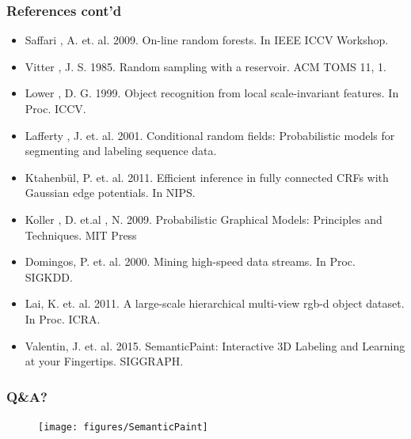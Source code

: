 \documentclass[mathserif, 10pt]{beamer}
\begin{document}
\begin{frame}
\frametitle{References cont'd}
\fontsize{6pt}{7.2}\selectfont
\begin{itemize}
  \item Saffari , A. et. al. 2009. On-line random forests. In IEEE ICCV Workshop.
  
  \item Vitter , J. S. 1985. Random sampling with a reservoir. ACM TOMS 11, 1. 
  
  \item Lower , D. G. 1999. Object recognition from local scale-invariant features. In Proc. ICCV.
  
  \item Lafferty , J. et. al. 2001. Conditional random fields: Probabilistic models for segmenting and labeling sequence data.
  
  \item Ktahenbül, P. et. al. 2011. Efficient inference in fully connected CRFs with Gaussian edge potentials. In NIPS.

  \item Koller , D. et.al  , N. 2009. Probabilistic Graphical Models: Principles and Techniques. MIT Press
  
  \item Domingos, P. et. al. 2000. Mining high-speed data streams. In Proc. SIGKDD.
	
  \item Lai, K. et. al. 2011. A large-scale hierarchical multi-view rgb-d object dataset. In Proc. ICRA.
  
  \item Valentin, J. et. al. 2015. SemanticPaint: Interactive 3D Labeling and Learning at your Fingertips. SIGGRAPH.
\end{itemize}
\end{frame}

\begin{frame}
\frametitle{Q\&A?}
\begin{figure}
 \texttt{[image: figures/SemanticPaint]}
\end{figure}

\end{frame}


\end{document}
